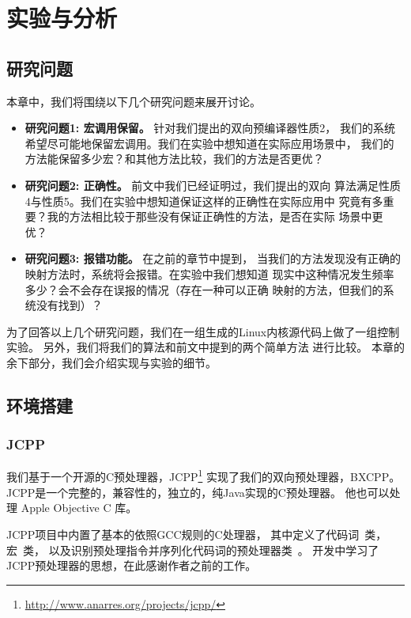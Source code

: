 \chapter{实验与分析}
\label{sec:evaluation}
\section{研究问题}
本章中，我们将围绕以下几个研究问题来展开讨论。
\begin{itemize}
\item {\bf 研究问题1: 宏调用保留。} 针对我们提出的双向预编译器性质2，
  我们的系统希望尽可能地保留宏调用。我们在实验中想知道在实际应用场景中，
  我们的方法能保留多少宏？和其他方法比较，我们的方法是否更优？
\item {\bf 研究问题2: 正确性。} 前文中我们已经证明过，我们提出的双向
  算法满足性质4与性质5。我们在实验中想知道保证这样的正确性在实际应用中
  究竟有多重要？我的方法相比较于那些没有保证正确性的方法，是否在实际
  场景中更优？
\item {\bf 研究问题3: 报错功能。}  在之前的章节中提到，
  当我们的方法发现没有正确的映射方法时，系统将会报错。在实验中我们想知道
  现实中这种情况发生频率多少？会不会存在误报的情况（存在一种可以正确
  映射的方法，但我们的系统没有找到）？
\end{itemize}

为了回答以上几个研究问题，我们在一组生成的Linux内核源代码上做了一组控制
实验。
另外，我们将我们的算法和前文中提到的两个简单方法
进行比较。
本章的余下部分，我们会介绍实现与实验的细节。

\section{环境搭建}

\subsection{JCPP}
我们基于一个开源的C预处理器，JCPP\footnote{\url{http://www.anarres.org/projects/jcpp/}}
实现了我们的双向预处理器，BXCPP。
JCPP是一个完整的，兼容性的，独立的，纯Java实现的C预处理器。
他也可以处理 Apple Objective C 库。

JCPP项目中内置了基本的依照GCC规则的C处理器，
其中定义了代码词~类，宏~类，
以及识别预处理指令并序列化代码词的预处理器类~。
开发中学习了JCPP预处理器的思想，在此感谢作者之前的工作。

